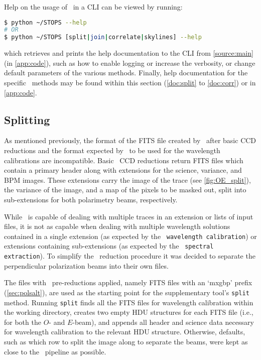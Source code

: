 Help on the usage of \stops\ in a \gls{CLI} can be viewed by running:
\begin{lstlisting}[language=bash]
$ python ~/STOPS --help
# OR
$ python ~/STOPS [split|join|correlate|skylines] --help
\end{lstlisting}
{\parskip=0pt which} retrieves and prints the help documentation to the \gls{CLI} from \autoref{source:main} (in \autoref{app:code}), such as how to enable logging or increase the verbosity, or change default parameters of the various methods.
Finally, help documentation for the specific \stops\ methods may be found within this section (\autoref{doc:split} to \ref{doc:corr}) or in \autoref{app:code}.

\subsection{Splitting} \label{subsec:stops_split}



As mentioned previously, the format of the \gls{FITS} file created by \polsalt\ after basic \gls{CCD} reductions and the format expected by \iraf\ to be used for the wavelength calibrations are incompatible.
Basic \polsalt\ \gls{CCD} reductions return \gls{FITS} files which contain a primary header along with extensions for the science, variance, and \gls{BPM} images.
These extensions carry the image of the trace (see \autoref{fig:OE_split}), the variance of the image, and a map of the pixels to be masked out, split into sub-extensions for both polarimetry beams, respectively.

While \iraf\ is capable of dealing with multiple traces in an extension or lists of input files, it is not as capable when dealing with multiple wavelength solutions contained in a single extension (as expected by the \polsalt\ \texttt{wavelength calibration}) or extensions containing sub-extensions (as expected by the \polsalt\ \texttt{spectral extraction}).
To simplify the \iraf\ reduction procedure it was decided to separate the perpendicular polarization beams into their own files.

The files with \polsalt\ pre-reductions applied, namely \gls{FITS} files with an `mxgbp' prefix (\autoref{sec:polsalt}), are used as the starting point for the supplementary tool's \texttt{split} method.
Running \texttt{split} finds all the \gls{FITS} files for wavelength calibration within the working directory, creates two empty \gls{HDU} structures for each \gls{FITS} file (i.e., for both the $O$- and $E$-beam), and appends all header and science data necessary for wavelength calibration to the relevant \gls{HDU} structure.
Otherwise, defaults, such as which row to split the image along to separate the beams, were kept as close to the \polsalt\ pipeline as possible.

